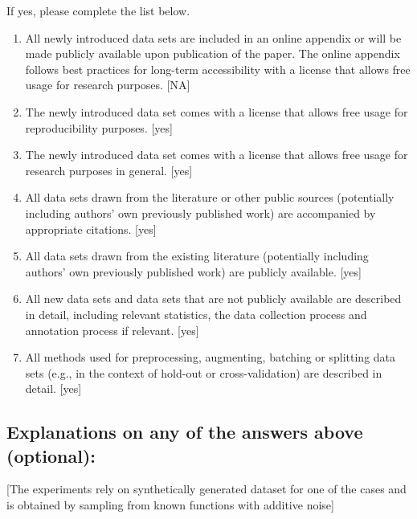 \documentclass[manuscript, screen, review]{jair}
\begin{document}
If yes, please complete the list below.
\begin{enumerate}
    \item 
    All newly introduced data sets 
    are included in an online appendix 
    or will be made publicly available upon publication of the paper.
    The online appendix follows best practices for long-term accessibility with a license
    that allows free usage for research purposes.
    [NA]
    \item The newly introduced data set comes with a license that
    allows free usage for reproducibility purposes.
    [yes]
    \item The newly introduced data set comes with a license that
    allows free usage for research purposes in general.
    [yes]
    \item All data sets drawn from the literature or other public sources (potentially including authors' own previously published work) are accompanied by appropriate citations.
    [yes]
    \item All data sets drawn from the existing literature (potentially including authors’ own previously published work) are publicly available. [yes]
    \item All new data sets and data sets that are not publicly available are described in detail, including relevant statistics, the data collection process and annotation process if relevant.
    [yes]
    \item 
    All methods used for preprocessing, augmenting, batching or splitting data sets (e.g., in the context of hold-out or cross-validation)
    are described in detail. [yes]
\end{enumerate}

\subsection*{Explanations on any of the answers above (optional):}

[The experiments rely on synthetically generated dataset for one of the cases and is obtained by sampling 
from known functions with additive noise]
\end{document}
